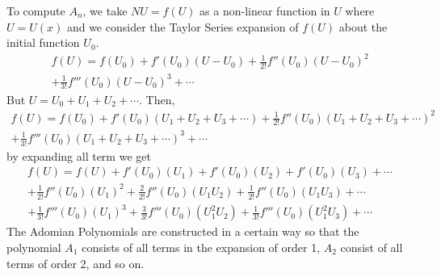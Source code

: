 \documentclass[11pt]{report}
\newcommand{\sps}{\\[0.2cm]}
\newcommand{\NI}{\noindent}
\newcommand{\sprime}{'}
\newcommand{\dprime}{''}
\newcommand{\tprime}{'''}
\begin{document}
	\NI To compute $A_n$, we take $NU=f(U)$ as a non-linear function in $U$ where $U=U(x)$ and we consider the Taylor Series expansion of $f(U)$ about the initial function $U_0$.
	\begin{multline}
		f(U) = f(U_0) + f\sprime(U_0)(U-U_0) + \frac{1}{2!}f\dprime(U_0)(U-U_0)^2 \sps
		+ \frac{1}{3!}f\tprime(U_0)(U-U_0)^3 + \cdots
	\end{multline}
	But $U=U_0+U_1+U_2+\cdots$. Then,
	\begin{multline}
		f(U) = f(U_0) + f\sprime(U_0)(U_1+U_2+U_3+\cdots) + \frac{1}{2!}f\dprime(U_0)(U_1+U_2+U_3+\cdots)^2 \sps
		+ \frac{1}{3!}f\tprime(U_0)(U_1+U_2+U_3+\cdots)^3 + \cdots
	\end{multline}
	by expanding all term we get
	\begin{multline}
		f(U) = f(U) + f\sprime(U_0)(U_1) + f\sprime(U_0)(U_2)+ f\sprime(U_0)(U_3) + \cdots \sps
		+ \frac{1}{2!}f\dprime(U_0)(U_1)^2 + \frac{2}{2!}f\dprime(U_0)(U_1U_2) + \frac{1}{2!}f\dprime(U_0)(U_1U_3) + \cdots \sps
		+ \frac{1}{3!}f\tprime(U_0)(U_1)^3 + \frac{3}{3!}f\tprime(U_0)(U_1^2U_2) + \frac{1}{3!}f\tprime(U_0)(U_1^2U_3) + \cdots
	\end{multline}
	The Adomian Polynomials are constructed in a certain way so that the polynomial $A_1$ consists of all terms in the expansion of order 1, $A_2$ consist of all terms of order 2, and so on.\\
	
\end{document}
